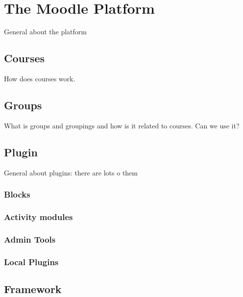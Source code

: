 
\section{The Moodle Platform}
\label{sec:moodleplatform}
	General about the platform






\subsection{Courses}
	How does courses work.






\subsection{Groups}
	What is groups and groupings and how is it related to courses. Can we use it?




\subsection{Plugin}
	General about plugins: there are lots o them 




	\subsubsection{Blocks}





	\subsubsection{Activity modules}





	\subsubsection{Admin Tools}






	\subsubsection{Local Plugins}




\subsection{Framework}

